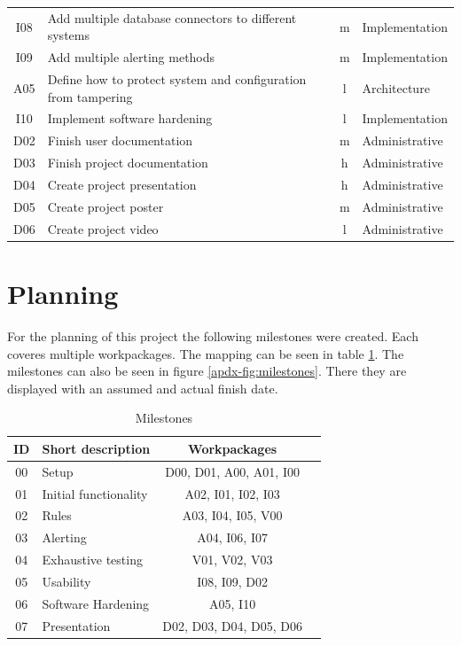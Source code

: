 \documentclass[
	a4paper,					%
	10pt,							%
	twoside,					%
	openright,				%
	notitlepage,			%
	parskip=half,			%
]{scrreprt}					%
\begin{document}
\begin{table}[h!]
\begin{center}
\begin{tabular}{c|l|c|l}
			I08 & Add multiple database connectors to different systems & m & Implementation \\
			I09 & Add multiple alerting methods & m & Implementation \\
			A05 & Define how to protect system and configuration from tampering & l & Architecture \\
			I10 & Implement software hardening & l & Implementation \\
			D02 & Finish user documentation & m & Administrative \\
			D03 & Finish project documentation & h & Administrative \\ 
			D04 & Create project presentation & h & Administrative \\
			D05 & Create project poster & m & Administrative \\
			D06 & Create project video & l & Administrative \\
    \end{tabular}
  \end{center}
\end{table}

\section{Planning}

For the planning of this project the following milestones were created. Each coveres multiple workpackages. The mapping can be seen in table \ref{tab:milestones}. The milestones can also be seen in figure \ref{apdx-fig:milestones}. There they are displayed with an assumed and actual finish date.



\begin{table}[h!]
  \begin{center}
    \caption{Milestones}
    \label{tab:milestones}
    \begin{tabular}{c|l|c|l}
      \textbf{ID} & \textbf{Short description} & \textbf{Workpackages} \\
      \hline
			00 & Setup & D00, D01, A00, A01, I00 \\
			01 & Initial functionality & A02, I01, I02, I03 \\
			02 & Rules & A03, I04, I05, V00 \\
			03 & Alerting & A04, I06, I07 \\
			04 & Exhaustive testing & V01, V02, V03 \\
			05 & Usability & I08, I09, D02 \\
			06 & Software Hardening & A05, I10 \\
			07 & Presentation & D02, D03, D04, D05, D06 \\
    \end{tabular}
  \end{center}
\end{table}
\end{document}
